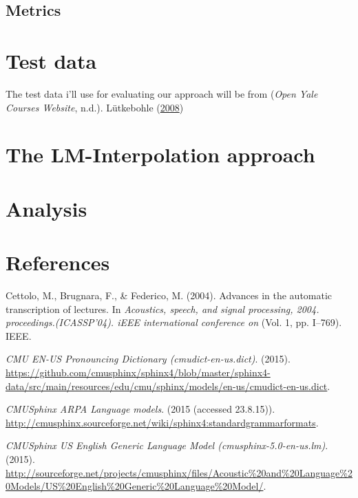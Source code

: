 \documentclass[]{article}
\begin{document}
\subsection{Metrics}\label{metrics}

\section{Test data}\label{test-data}

The test data i'll use for evaluating our approach will be from
(\emph{Open Yale Courses Website}, n.d.). Lütkebohle
(\hyperref[ref-bworld]{2008})

\section{The LM-Interpolation
approach}\label{the-lm-interpolation-approach}

\section{Analysis}\label{analysis}

\newpage

\section*{References}\label{references}

Cettolo, M., Brugnara, F., \& Federico, M. (2004). Advances in the
automatic transcription of lectures. In \emph{Acoustics, speech, and
signal processing, 2004. proceedings.(ICASSP'04). iEEE international
conference on} (Vol. 1, pp. I--769). IEEE.

\emph{CMU EN-US Pronouncing Dictionary (cmudict-en-us.dict)}. (2015).
\url{https://github.com/cmusphinx/sphinx4/blob/master/sphinx4-data/src/main/resources/edu/cmu/sphinx/models/en-us/cmudict-en-us.dict}.

\emph{CMUSphinx ARPA Language models}. (2015 (accessed 23.8.15)).
\url{http://cmusphinx.sourceforge.net/wiki/sphinx4:standardgrammarformats}.

\emph{CMUSphinx US English Generic Language Model
(cmusphinx-5.0-en-us.lm)}. (2015).
\url{http://sourceforge.net/projects/cmusphinx/files/Acoustic\%20and\%20Language\%20Models/US\%20English\%20Generic\%20Language\%20Model/}.
\end{document}
